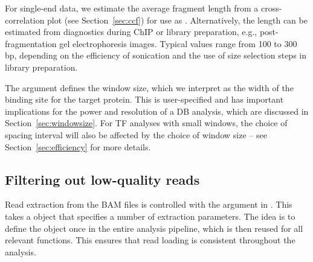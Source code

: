 \documentclass{report}\usepackage[]{graphicx}\usepackage[usenames,dvipsnames]{color}
\begin{document}
For single-end data, we estimate the average fragment length from a cross-correlation plot (see Section~\ref{sec:ccf}) for use as .
Alternatively, the length can be estimated from diagnostics during ChIP or library preparation, e.g., post-fragmentation gel electrophoresis images. 
Typical values range from 100 to 300 bp, depending on the efficiency of sonication and the use of size selection steps in library preparation.

\begin{center}
\end{center}

The  argument defines the window size, which we interpret as the width of the binding site for the target protein.
This is user-specified and has important implications for the power and resolution of a DB analysis, which are discussed in Section~\ref{sec:windowsize}.
For TF analyses with small windows, the choice of spacing interval will also be affected by the choice of window size -- see Section~\ref{sec:efficiency} for more details.

\subsection{Filtering out low-quality reads}
Read extraction from the BAM files is controlled with the  argument in .
This takes a  object that specifies a number of extraction parameters.
The idea is to define the  object once in the entire analysis pipeline, which is then reused for all relevant functions.
This ensures that read loading is consistent throughout the analysis.
\end{document}
